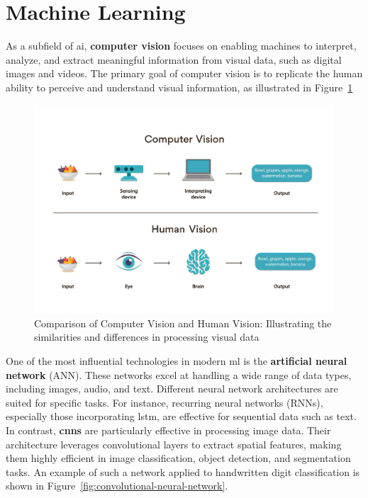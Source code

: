 \section{Machine Learning} \label{sec:machine-learning}

As a subfield of \gls{ai}, \textbf{computer vision} focuses on enabling machines to interpret, analyze, and extract meaningful information from visual data, such as digital images and videos. The primary goal of computer vision is to replicate the human ability to perceive and understand visual information, as illustrated in Figure~\ref{fig:computer-vision}

\begin{figure}[h!] \centering \includegraphics[width=0.75\linewidth]{figures/theory/machine-learning/computer-vision.png} \caption[Computer Vision vs. Human Vision]{Comparison of Computer Vision and Human Vision: Illustrating the similarities and differences in processing visual data \cite{turing:computer-vision}} \label{fig:computer-vision} \end{figure}

One of the most influential technologies in modern \gls{ml} is the \textbf{artificial neural network} (ANN). These networks excel at handling a wide range of data types, including images, audio, and text. Different neural network architectures are suited for specific tasks. For instance, recurring neural networks (RNNs), especially those incorporating \gls{lstm}, are effective for sequential data such as text. \\

In contrast, \textbf{\glspl{cnn}} are particularly effective in processing image data. Their architecture leverages convolutional layers to extract spatial features, making them highly efficient in image classification, object detection, and segmentation tasks. An example of such a network applied to handwritten digit classification is shown in Figure~\ref{fig:convolutional-neural-network}. \\

